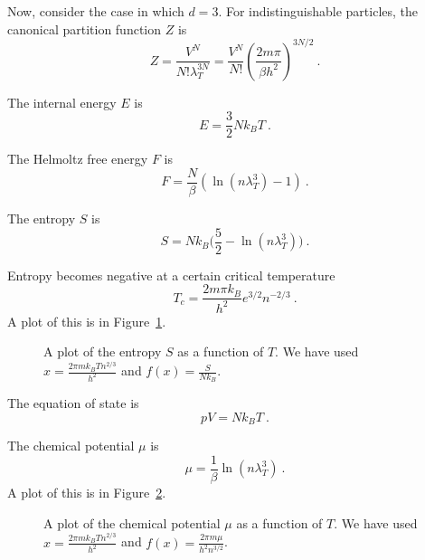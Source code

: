     Now, consider the case in which $d = 3$.
    For indistinguishable particles, the canonical partition function $Z$ is 
    \begin{equation*}
        Z = \frac{V^N}{N! \lambda^{3N}_T} = \frac{V^N}{N!} (\frac{2 m \pi}{\beta h^2})^{3N/2} ~.
    \end{equation*}
    
    The internal energy $E$ is 
    \begin{equation*}
        E = \frac{3}{2} N k_B T ~.
    \end{equation*}
    
    The Helmoltz free energy $F$ is 
    \begin{equation*}
        F = \frac{N}{\beta} (\ln (n \lambda_T^3) - 1) ~.
    \end{equation*}
    
    The entropy $S$ is 
    \begin{equation*}
        S = N k_B \Big ( \frac{5}{2} - \ln (n \lambda_T^3) \Big ) ~.
    \end{equation*}
    
    Entropy becomes negative at a certain critical temperature
    \begin{equation*}
        T_c = \frac{2 m \pi k_B}{h^2} e^{3/2} n^{-2/3} ~.
    \end{equation*}
    A plot of this is in Figure~\ref{can:ent}.
    \begin{figure}
        \centering
        \caption{A plot of the entropy $S$ as a function of $T$. We have used $x = \frac{2 \pi m k_B T n^{2/3}}{h^2}$ and $f(x) = \frac{S}{N k_B}$.}
        \label{can:ent}
    \end{figure}
    
    The equation of state is 
    \begin{equation*}
        p V = N k_B T ~.
    \end{equation*}
    
    The chemical potential $\mu$ is 
    \begin{equation*}
        \mu = \frac{1}{\beta} \ln (n \lambda_T^3) ~.
    \end{equation*}
    A plot of this is in Figure~\ref{can:mu}.
    \begin{figure}
        \centering
        \caption{A plot of the chemical potential $\mu$ as a function of $T$. We have used $x = \frac{2 \pi m k_B T n^{2/3}}{h^2}$ and $f(x) = \frac{2 \pi m \mu}{h^2 n^{3/2}}$.}
        \label{can:mu}
    \end{figure}
    
